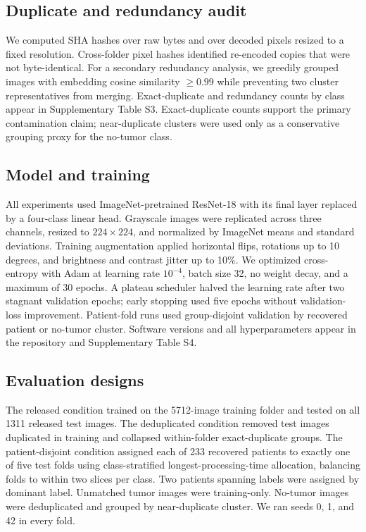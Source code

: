 ﻿\documentclass[11pt]{article}
\begin{document}
\subsection{Duplicate and redundancy audit}
We computed SHA hashes over raw bytes and over decoded pixels resized to a fixed resolution. Cross-folder pixel hashes identified re-encoded copies that were not byte-identical. For a secondary redundancy analysis, we greedily grouped images with embedding cosine similarity $\geq0.99$ while preventing two cluster representatives from merging. Exact-duplicate and redundancy counts by class appear in Supplementary Table S3. Exact-duplicate counts support the primary contamination claim; near-duplicate clusters were used only as a conservative grouping proxy for the no-tumor class.

\subsection{Model and training}
All experiments used ImageNet-pretrained ResNet-18\cite{he2016deep} with its final layer replaced by a four-class linear head. Grayscale images were replicated across three channels, resized to $224\times224$, and normalized by ImageNet means and standard deviations. Training augmentation applied horizontal flips, rotations up to 10 degrees, and brightness and contrast jitter up to 10\%. We optimized cross-entropy with Adam at learning rate $10^{-4}$, batch size 32, no weight decay, and a maximum of 30 epochs. A plateau scheduler halved the learning rate after two stagnant validation epochs; early stopping used five epochs without validation-loss improvement. Patient-fold runs used group-disjoint validation by recovered patient or no-tumor cluster. Software versions and all hyperparameters appear in the repository and Supplementary Table S4.

\subsection{Evaluation designs}
The released condition trained on the 5712-image training folder and tested on all 1311 released test images. The deduplicated condition removed test images duplicated in training and collapsed within-folder exact-duplicate groups. The patient-disjoint condition assigned each of 233 recovered patients to exactly one of five test folds using class-stratified longest-processing-time allocation, balancing folds to within two slices per class. Two patients spanning labels were assigned by dominant label. Unmatched tumor images were training-only. No-tumor images were deduplicated and grouped by near-duplicate cluster. We ran seeds 0, 1, and 42 in every fold.
\end{document}
